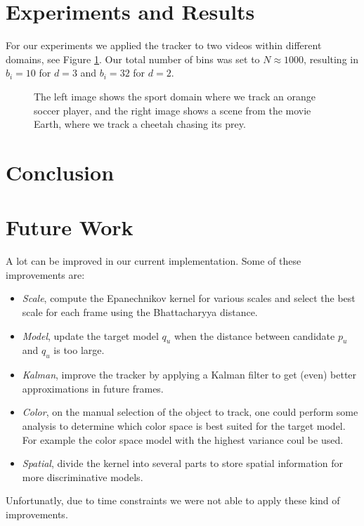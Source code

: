 \documentclass[11pt]{article}
\begin{document}
\section{Experiments and Results}
For our experiments we applied the tracker to two videos within different
domains, see Figure \ref{fig:videos}. Our total number of bins was set to $N
\approx 1000$, resulting in $b_i = 10$ for $d = 3$ and $b_i = 32$ for $d = 2$.
\begin{figure}[!ht]
\centering
\caption{The left image shows the sport domain where we track an orange soccer
player, and the right image shows a scene from the movie Earth, where we track
a cheetah chasing its prey.}
\label{fig:videos}
\end{figure}


\section{Conclusion}


\section{Future Work}
A lot can be improved in our current implementation. Some of these improvements
are:
\begin{itemize}
\item{\emph{Scale}, compute the Epanechnikov kernel for various scales and
select the best scale for each frame using the Bhattacharyya distance.}
\item{\emph{Model}, update the target model $q_u$ when the distance between
candidate $p_u$ and $q_u$ is too large.}
\item{\emph{Kalman}, improve the tracker by applying a Kalman filter to get
(even) better approximations in future frames.}
\item{\emph{Color}, on the manual selection of the object to track, one could
perform some analysis to determine which color space is best suited for the
target model. For example the color space model with the highest variance coul
be used.}
\item{\emph{Spatial}, divide the kernel into several parts to store spatial
information for more discriminative models.}
\end{itemize}
Unfortunatly, due to time constraints we were not able to apply these kind of
improvements.

\renewcommand\bibname{References}


\end{document}
